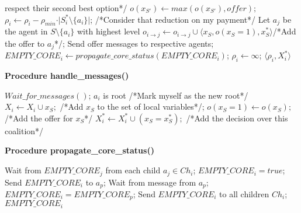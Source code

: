 \documentclass{article}
\begin{document}
\begin{algorithm}[!tb]
\begin{algorithmic}[1]
	  			respect their second best option*/
	  		\ENDIF 
	  		\STATE $o(x_{S'})\leftarrow max(o(x_{S'}),offer);$
		\ENDFOR
	  	\ENDIF
  \ENDFOR
    \STATE $\rho_i \leftarrow  \rho_i - \rho_{min}\cdot \vert S^*_i\setminus
  			\{a_i\}\vert$; /*Consider that reduction on my payment*/
   			\STATE Let $a_j$ be the agent in $S\setminus \{a_i\}$ with highest level
   			\STATE $o_{i\rightarrow j}\leftarrow o_{i\rightarrow j} \cup \langle
   			x_{S}, o(x_{S}=1),x^*_{S}\rangle$/*Add the offer to $a_j$*/;
  \ENDFOR
  \STATE Send offer messages to respective agents;
  \STATE $EMPTY\_CORE_i\leftarrow propagate\_core\_status(EMPTY\_CORE_i)$;
  	\STATE $\rho_i \leftarrow \infty$;
  \ENDIF
 \RETURN $\langle \rho_i, X^*_{i} \rangle$
  \end{algorithmic}
 \label{proc:scf_graphs}
 \end{algorithm}
 
 
\begin{algorithm}[!tb]
\caption{\textbf{Procedure handle\_messages()}} 
 \begin{algorithmic}[1]
 \STATE $Wait\_for\_messages()$;
 	   \STATE $a_i$ is root /*Mark myself as the new root*/
 	\ENDIF
 	\STATE $X_i \leftarrow X_i \cup x_S;$ /*Add $x_S$ to the set of local
 	variables*/;
 	\STATE $o(x_S=1)\leftarrow o(x_S);$ /*Add the offer for $x_S$*/
 	\STATE $X^{*}_i \leftarrow X^{*}_i \cup (x_S=x^*_S);$ /*Add the decision over
 	this coalition*/
 	\ENDFOR
 \ENDIF
 \ENDFOR
 \end{algorithmic}
 \end{algorithm}


\begin{algorithm}[!tb]
\caption{\textbf{Procedure propagate\_core\_status()}} 
 \begin{algorithmic}[1]
 \STATE Wait from $EMPTY\_CORE_j$ from each child $a_j\in Ch_i$;
 	\STATE $EMPTY\_CORE_i=true$;
 \ENDIF
    \STATE Send $EMPTY\_CORE_i$ to $a_p$;
 	\STATE Wait from message from $a_p$;
    \STATE $EMPTY\_CORE_i=EMPTY\_CORE_p$;
 \ENDIF
 \STATE Send $EMPTY\_CORE_i$ to all children $Ch_i$;
 \RETURN $EMPTY\_CORE_i$
 \end{algorithmic}
 \end{algorithm}
 
\end{document}
